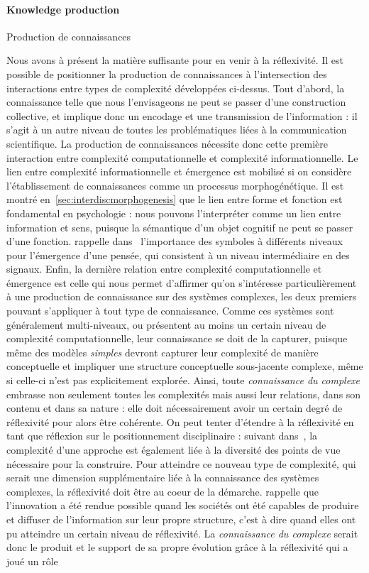 \paragraph{Knowledge production}{Production de connaissances}

Nous avons à présent la matière suffisante pour en venir à la réflexivité. Il est possible de positionner la production de connaissances à l'intersection des interactions entre types de complexité développées ci-dessus. Tout d'abord, la connaissance telle que nous l'envisageons ne peut se passer d'une construction collective, et implique donc un encodage et une transmission de l'information : il s'agit à un autre niveau de toutes les problématiques liées à la communication scientifique. La production de connaissances nécessite donc cette première interaction entre complexité computationnelle et complexité informationnelle. Le lien entre complexité informationnelle et émergence est mobilisé si on considère l'établissement de connaissances comme un processus morphogénétique. Il est montré en~\ref{sec:interdiscmorphogenesis} que le lien entre forme et fonction est fondamental en psychologie : nous pouvons l'interpréter comme un lien entre information et sens, puisque la sémantique d'un objet cognitif ne peut se passer d'une fonction.  rappelle dans~\cite{hofstadter1980godel} l'importance des symboles à différents niveaux pour l'émergence d'une pensée, qui consistent à un niveau intermédiaire en des signaux. Enfin, la dernière relation entre complexité computationnelle et émergence est celle qui nous permet d'affirmer qu'on s'intéresse particulièrement à une production de connaissance sur des systèmes complexes, les deux premiers pouvant s'appliquer à tout type de connaissance. Comme ces systèmes sont généralement multi-niveaux, ou présentent au moins un certain niveau de complexité computationnelle, leur connaissance se doit de la capturer, puisque même des modèles \emph{simples} devront capturer leur complexité de manière conceptuelle et impliquer une structure conceptuelle sous-jacente complexe, même si celle-ci n'est pas explicitement explorée. Ainsi, toute \emph{connaissance du complexe} embrasse non seulement toutes les complexités mais aussi leur relations, dans son contenu et dans sa nature : elle doit nécessairement avoir un certain degré de réflexivité pour alors être cohérente. On peut tenter d'étendre à la réflexivité en tant que réflexion sur le positionnement disciplinaire : suivant  dans~\cite{pumain2005cumulativite}, la complexité d'une approche est également liée à la diversité des points de vue nécessaire pour la construire. Pour atteindre ce nouveau type de complexité, qui serait une dimension supplémentaire liée à la connaissance des systèmes complexes, la réflexivité doit être au coeur de la démarche. \cite{read2009innovation} rappelle que l'innovation a été rendue possible quand les sociétés ont été capables de produire et diffuser de l'information sur leur propre structure, c'est à dire quand elles ont pu atteindre un certain niveau de réflexivité. La \emph{connaissance du complexe} serait donc le produit et le support de sa propre évolution grâce à la réflexivité qui a joué un rôle 